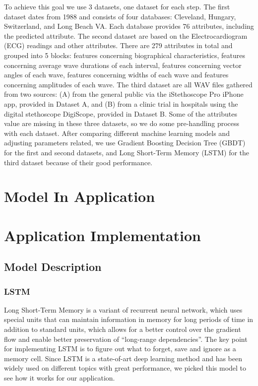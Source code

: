 \documentclass[letterpaper]{article} %
\begin{document}
To achieve this goal we use 3 datasets, one dataset for each step. The first dataset dates from 1988 and consists of four databases: Cleveland, Hungary, Switzerland, and Long Beach VA. Each database provides 76 attributes, including the predicted attribute. The second dataset are based on the Electrocardiogram (ECG) readings and other attributes. There are 279 attributes in total and grouped into 5 blocks: features concerning biographical characteristics, features concerning average wave durations of each interval, features concerning vector angles of each wave, features concerning widths of each wave and features concerning amplitudes of each wave. The third dataset are all WAV files gathered from two sources: (A) from the general public via the iStethoscope Pro iPhone app, provided in Dataset A, and (B) from a clinic trial in hospitals using the digital stethoscope DigiScope, provided in Dataset B. Some of the attributes value are missing in these three datasets, so we do some pre-handling process with each dataset. After comparing different machine learning models and adjusting parameters related, we use Gradient Boosting Decision Tree (GBDT) for the first and second datasets, and Long Short-Term Memory (LSTM) for the third dataset because of their good performance.


\section{Model In Application}

\section{Application Implementation}

\subsection{Model Description}

\subsubsection{LSTM}

Long Short-Term Memory is a variant of recurrent neural network, which uses special units that can maintain information in memory for long periods of time in addition to standard units, which allows for a better control over the gradient flow and enable better preservation of “long-range dependencies”. The key point for implementing LSTM is to figure out what to forget, save and ignore as a memory cell. Since LSTM is a state-of-art deep learning method and has been widely used on different topics with great performance, we picked this model to see how it works for our application. 
\end{document}
